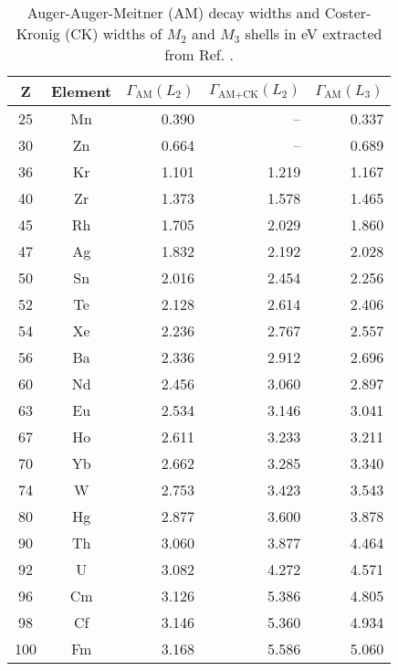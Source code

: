 \begin{table}[h]
 \caption{Auger-Auger-Meitner (AM) decay widths and Coster-Kronig (CK) widths
          of $M_2$ and $M_3$ shells in \unit{eV} extracted from
          Ref. \cite{Chen81}.}
 \begin{tabular}{ccrrr}
 \toprule
 Z & Element & $\Gamma_\text{AM}(L_2)$ & $\Gamma_\text{AM+CK}(L_2)$ & $\Gamma_\text{AM}(L_3)$\\
 \midrule
 25 & Mn & 0.390 &  --   & 0.337 \\
 30 & Zn & 0.664 &  --   & 0.689 \\
 36 & Kr & 1.101 & 1.219 & 1.167 \\
 40 & Zr & 1.373 & 1.578 & 1.465 \\
 45 & Rh & 1.705 & 2.029 & 1.860 \\
 47 & Ag & 1.832 & 2.192 & 2.028 \\
 50 & Sn & 2.016 & 2.454 & 2.256 \\
 52 & Te & 2.128 & 2.614 & 2.406 \\
 54 & Xe & 2.236 & 2.767 & 2.557 \\
 56 & Ba & 2.336 & 2.912 & 2.696 \\
 60 & Nd & 2.456 & 3.060 & 2.897 \\
 63 & Eu & 2.534 & 3.146 & 3.041 \\
 67 & Ho & 2.611 & 3.233 & 3.211 \\
 70 & Yb & 2.662 & 3.285 & 3.340 \\
 74 & W  & 2.753 & 3.423 & 3.543 \\
 80 & Hg & 2.877 & 3.600 & 3.878 \\
 90 & Th & 3.060 & 3.877 & 4.464 \\
 92 & U  & 3.082 & 4.272 & 4.571 \\
 96 & Cm & 3.126 & 5.386 & 4.805 \\
 98 & Cf & 3.146 & 5.360 & 4.934 \\
100 & Fm & 3.168 & 5.586 & 5.060 \\
 \bottomrule
 \end{tabular}
 \label{tab:L}
\end{table}
